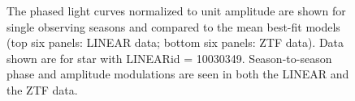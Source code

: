 \begin{figure}[ht]
    \centering
    \caption{The phased light curves normalized to unit amplitude are shown for single observing seasons
      and compared to the mean best-fit models (top six panels: LINEAR data; bottom six panels: ZTF data).
      Data shown are for star with LINEARid = 10030349.
      Season-to-season phase and amplitude modulations are seen in both the LINEAR and the ZTF data.}
      \label{fig:phase4}
\end{figure}



